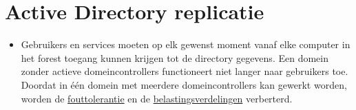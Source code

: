 \documentclass{report}
\begin{document}
	\section{Active Directory replicatie }
	\begin{enumerate}
		 {
			\begin{itemize}
				\item Gebruikers en services moeten op elk gewenst moment vanaf elke computer in het forest toegang kunnen krijgen tot de directory gegevens. Een domein zonder actieve domeincontrollers functioneert niet langer naar gebruikers toe. Doordat in één domein met meerdere domeincontrollers kan gewerkt worden, worden de \underline{fouttolerantie} en de \underline{belastingsverdelingen} verberterd.
			\end{itemize}
		}
		

\end{enumerate}
\end{document}
